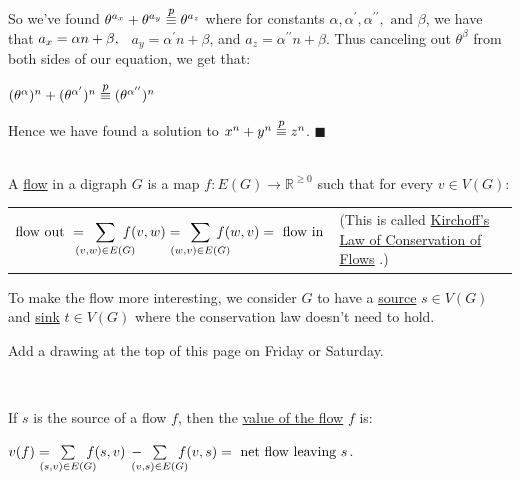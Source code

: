 \documentclass{book}
\newcommand{\hTwo}{%
   \color{MidnightBlue}%
   \fontsize{13}{15}\selectfont%
}
\newcommand{\exOne}{%
   \color{Purple}%
   \fontsize{14}{16}\selectfont%
}
\newenvironment{myIndent}{%
   \begin{adjustwidth}{2.5em}{0em}%
}{%
   \end{adjustwidth}%
}
\newcommand{\udefine}[1]{{%
   \setulcolor{Red}%
   \setul{0.14em}{0.07em}%
   \ul{#1}%
}}
\newcommand{\pprime}{\prime\prime}
\newcommand{\myHS}{ \hspace{0.5em}}
\newcommand{\myequiv}[1]{\stackrel{\mathclap{\mbox{\footnotesize{$#1$}}}}{\equiv}}
\newcommand{\mySepTwo}[1][.]{%
   {\noindent\color{#1}{\rule{6.5in}{0.5mm}}}\\%
}
\newcommand{\retTwo}{\hfill\bigbreak}
\begin{document}
{\begin{myIndent}
   So we've found $\theta^{a_x} + \theta^{a_y} \myequiv{p} \theta^{a_z}$ where for constants $\alpha, \alpha^\prime, \alpha^{\pprime}, \text{ and } \beta$, we have that $a_x = \alpha n + \beta,\myHS$ $a_y = \alpha^\prime n + \beta$, and $a_z = \alpha^{\pprime}n + \beta$. Thus canceling out $\theta^\beta$ from both sides of our equation, we get that:

   {\center $ (\theta^\alpha)^n + (\theta^{\alpha^\prime})^n \myequiv{p} (\theta^{\alpha^{\pprime}})^n $ \retTwo\par}

   Hence we have found a solution to $x^n + y^n \myequiv{p} z^n$. $\blacksquare$\retTwo
\end{myIndent}}

\mySepTwo

A \udefine{flow} in a digraph $G$ is a map $f: E(G) \rightarrow \mathbb{R}^{\geq 0}$ such that for every $v \in V(G)$:

{\begin{center}
   \begin{tabular}{ l p{2in} }
      $\text{flow out } = \hspace{-0.9em}{\displaystyle\sum\limits_{(v,w) \in E(G)}}\hspace{-0.9em}f(v, w) = \hspace{-1em}{\displaystyle\sum\limits_{(w,v) \in E(G)}}\hspace{-1em}f(w, v) = \text{ flow in}$ & \hTwo (This is called \udefine{Kirchoff's Law of Conservation of Flows}.)
   \end{tabular}\retTwo
\end{center}}

To make the flow more interesting, we consider $G$ to have a \udefine{source} $s \in V(G)$ and \udefine{sink} $t \in V(G)$ where the conservation law doesn't need to hold.

\newpage

{\exOne
{\color{BrickRed} Add a drawing at the top of this page on Friday or Saturday.
\retTwo
\retTwo
\retTwo
\retTwo
\retTwo
\retTwo
\retTwo}

\mySepTwo}

If $s$ is the source of a flow $f$, then the \udefine{value of the flow} $f$ is:

{\center $v(f) = \hspace{-1em}\sum\limits_{(s,v) \in E(G)}\hspace{-0.9em}f(s, v)\hspace{0.2em} - \hspace{-1em}\sum\limits_{(v,s) \in E(G)}\hspace{-0.9em}f(v, s) = \text{ net flow leaving } s$.\par}
\end{document}
